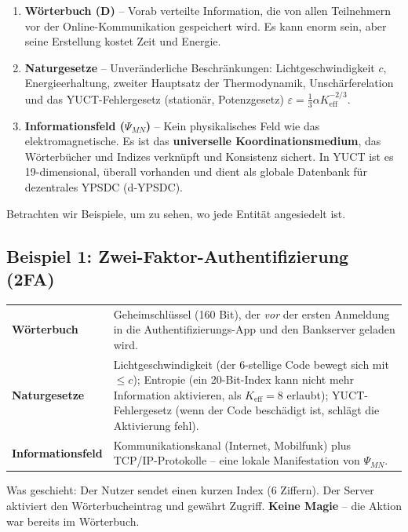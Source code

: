 \documentclass[12pt,a4paper]{article}
\begin{document}
	\begin{enumerate}
		\item \textbf{Wörterbuch (D)} – Vorab verteilte Information, die von allen Teilnehmern vor der Online-Kommunikation gespeichert wird. Es kann enorm sein, aber seine Erstellung kostet Zeit und Energie.
		\item \textbf{Naturgesetze} – Unveränderliche Beschränkungen: Lichtgeschwindigkeit \(c\), Energieerhaltung, zweiter Hauptsatz der Thermodynamik, Unschärferelation und das YUCT-Fehlergesetz (stationär, Potenzgesetz) \(\varepsilon = \frac13 \alpha K_{\mathrm{eff}}^{-2/3}\).
		\item \textbf{Informationsfeld (\(\Psi_{MN}\))} – Kein physikalisches Feld wie das elektromagnetische. Es ist das \textbf{universelle Koordinationsmedium}, das Wörterbücher und Indizes verknüpft und Konsistenz sichert. In YUCT ist es 19-dimensional, überall vorhanden und dient als globale Datenbank für dezentrales YPSDC (d‑YPSDC).
	\end{enumerate}
	
	Betrachten wir Beispiele, um zu sehen, wo jede Entität angesiedelt ist.
	
	\subsection{Beispiel 1: Zwei-Faktor-Authentifizierung (2FA)}
	\begin{tabular}{p{2.8cm} p{10cm}}
		\textbf{Wörterbuch} & Geheimschlüssel (160 Bit), der \emph{vor} der ersten Anmeldung in die Authentifizierungs-App und den Bankserver geladen wird. \\
		\textbf{Naturgesetze} & Lichtgeschwindigkeit (der 6-stellige Code bewegt sich mit \(\le c\)); Entropie (ein 20-Bit-Index kann nicht mehr Information aktivieren, als \(K_{\mathrm{eff}}=8\) erlaubt); YUCT-Fehlergesetz (wenn der Code beschädigt ist, schlägt die Aktivierung fehl). \\
		\textbf{Informationsfeld} & Kommunikationskanal (Internet, Mobilfunk) plus TCP/IP-Protokolle – eine lokale Manifestation von \(\Psi_{MN}\). \\
	\end{tabular}
	
	\noindent Was geschieht: Der Nutzer sendet einen kurzen Index (6 Ziffern). Der Server aktiviert den Wörterbucheintrag und gewährt Zugriff. \textbf{Keine Magie} – die Aktion war bereits im Wörterbuch.
	
\end{document}
